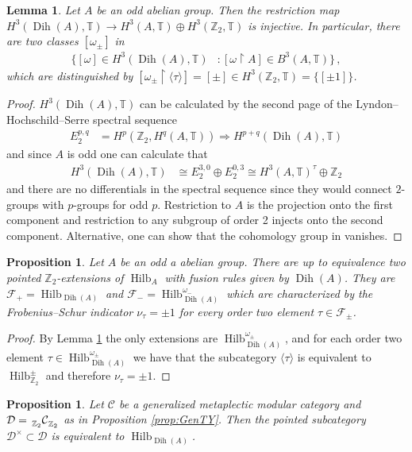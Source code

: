 \documentclass[twoside,11pt,reqno]{amsart}
\newtheorem{lem}[thm]{Lemma}
\newtheorem{prop}[thm]{Proposition}
\theoremstyle{definition}
\theoremstyle{remark}
\newcommand{\cF}{\mathcal{F}}
\newcommand{\cD}{\mathcal{D}}
\newcommand{\cC}{\mathcal{C}}
\newcommand{\TT}{\mathbb{T}}
\newcommand{\ZZ}{\mathbb{Z}}
\DeclareMathOperator{\Dih}{Dih}
\DeclareMathOperator{\Vect}{Hilb}
\newcommand{\bim}[4][]{{}\prescript{\vphantom{#1}}{#2}{#3}^{#1}_{#4}}
\begin{document}
\begin{lem}
  \label{lem:Cocycle}
  Let $A$ be an odd abelian group.  
  Then the restriction map 
  $H^3(\Dih(A),\TT)\to H^3(A,\TT)\oplus H^3(\ZZ_2,\TT)$ is injective.
  In particular, there are two classes $[\omega_\pm]$ in 
  \begin{align}
    \{[\omega] \in H^3(\Dih(A),\TT) &: [\omega\restriction A]\in B^3(A,\TT)\}\,,
  \end{align}
  which are distinguished by 
  $[\omega_\pm\restriction \langle \tau\rangle]=[\pm] \in H^3(\ZZ_2,\TT)
    =\{[\pm1]\}$.
\end{lem}
\begin{proof}
  $H^3(\Dih(A),\TT)$ can be calculated by the second page of the 
  Lyndon--Hochschild--Serre spectral sequence
  \begin{align}
    E_2^{p,q}&=H^p(\ZZ_2,H^q(A,\TT)) \Longrightarrow H^{p+q}(\Dih(A),\TT)  
  \end{align}
  and since $A$ is odd one can calculate that 
  \begin{align}
    H^3(\Dih(A),\TT) &\cong E_2^{3,0}\oplus E_2^{0,3}
    \cong H^3(A,\TT)^\tau \oplus \ZZ_2
  \end{align}
  and there are no differentials in the spectral sequence since they would 
  connect $2$-groups with $p$-groups for odd $p$.
  Restriction to $A$ is the projection onto the first component and 
  restriction to 
  any subgroup of order 2 injects onto the second component.
  Alternative, one can show that the cohomology group in 
  \cite[Definition 2.3]{IzKo2002} vanishes.
\end{proof}
\begin{prop} 
  Let $A$ be an odd a abelian group.
  There are up to equivalence two pointed $\ZZ_2$-extensions 
    of $\Vect_A$ 
  with fusion rules given by $\Dih(A)$. They are 
  $\cF_+=
    \Vect_{\Dih(A)}$ and $\cF_-=\Vect^{\omega_-}_{\Dih(A)}$ 
  which are characterized by the Frobenius--Schur indicator $\nu_{\tau}=\pm1$
  for every order two element $\tau\in\cF_\pm$.
\end{prop}
\begin{proof}
  By Lemma \ref{lem:Cocycle} the only extensions are 
  $\Vect^{\omega_\pm}_{\Dih(A)}$,
  and for each order two element $\tau \in \Vect^{\omega_\pm}_{\Dih(A)}$
  we have that the subcategory $\langle \tau\rangle$ is equivalent to 
  $\Vect^{\pm}_{\ZZ_2}$ and therefore $\nu_\tau=\pm1$.
\end{proof}
\begin{prop}
  \label{prop:TrivialDihCocycle}
  Let $\cC$ be a generalized metaplectic modular category and 
  $\cD=\bim{\ZZ_2}\cC{\ZZ_2}$ as in Proposition \ref{prop:GenTY}.
  Then the pointed subcategory $\cD^\times\subset \cD$ is equivalent to 
  $\Vect_{\Dih(A)}$.
\end{prop}
\end{document}
